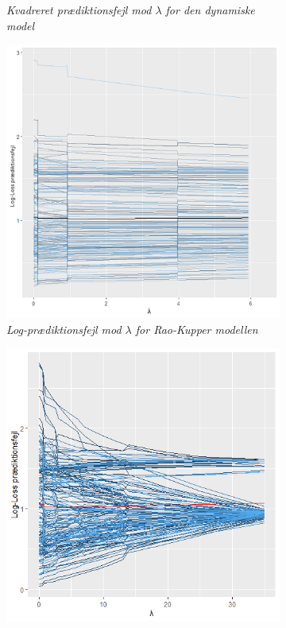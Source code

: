 \documentclass[11pt,a4paper]{article}
\begin{document}
\begin{figure}[h!]
\begin{subfigure}[b]{0.45\linewidth}
    \caption{\textit{Kvadreret prædiktionsfejl mod $\lambda$ for den dynamiske model}}
    \label{fig:DynMSPELine}
  \end{subfigure}
    \hspace{0.2cm}
    \begin{subfigure}[b]{0.45\textwidth}
    \includegraphics[width=\textwidth]{LOGLOSSSTATISK1.png}
    \caption{\textit{Log-prædiktionsfejl mod $\lambda$ for Rao-Kupper modellen}}
    \label{fig:LogLossStat}  
    \end{subfigure}
      \hspace{0.2cm}
  \begin{subfigure}[b]{0.45\linewidth}
\includegraphics[width=\textwidth]{LINELOGLOSSALPHA.png}

\end{subfigure}
\end{figure}
\end{document}
